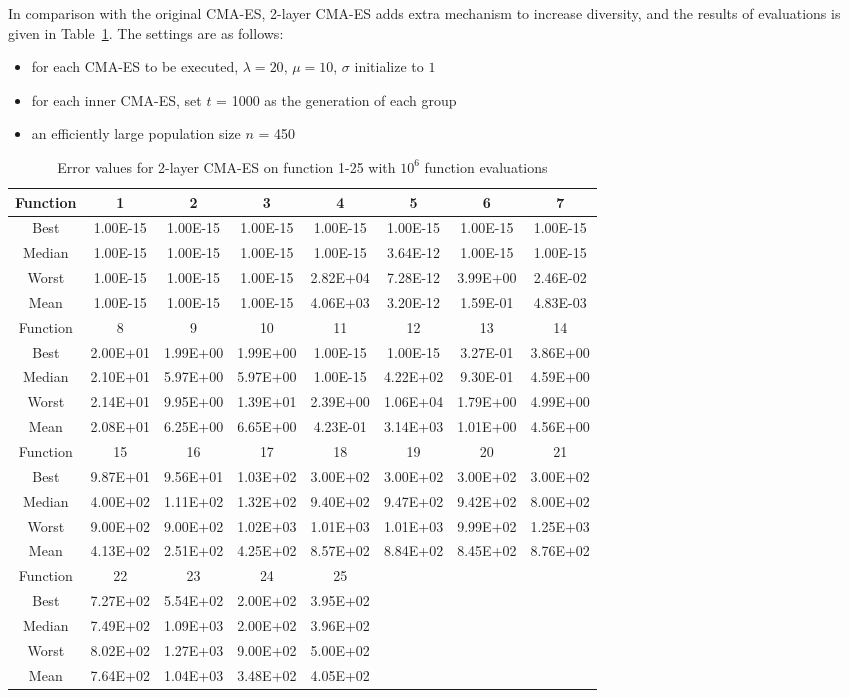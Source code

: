 In comparison with the original CMA-ES, 2-layer CMA-ES adds extra
mechanism to increase diversity, and the results of evaluations is given
in Table~\ref{table:2layercmaes}.
The settings are as follows:
\begin{itemize}
  \item{for each CMA-ES to be executed, $\lambda = 20$,
      $\mu=10$, $\sigma$ initialize to $1$}
  \item{for each inner CMA-ES, set $t$ = 1000 as the generation of each
    group}
  \item{an efficiently large population size $n$ = 450}
  \end{itemize}

\begin{table}[h]
\footnotesize
  \centering
\begin{tabular}{@{}cccccccc@{}}
\toprule
Function&1       &2       &3       &4       &5       &6       &7     \\ \midrule
Best    &1.00E-15&1.00E-15&1.00E-15&1.00E-15&1.00E-15&1.00E-15&1.00E-15 \\
Median  &1.00E-15&1.00E-15&1.00E-15&1.00E-15&3.64E-12&1.00E-15&1.00E-15\\
Worst   &1.00E-15&1.00E-15&1.00E-15&2.82E+04&7.28E-12&3.99E+00&2.46E-02\\
Mean    &1.00E-15&1.00E-15&1.00E-15&4.06E+03&3.20E-12&1.59E-01&4.83E-03\\\midrule
Function&8       &9       &10      &11      &12      &13      &14      \\\midrule
Best    &2.00E+01&1.99E+00&1.99E+00&1.00E-15&1.00E-15&3.27E-01&3.86E+00\\
Median  &2.10E+01&5.97E+00&5.97E+00&1.00E-15&4.22E+02&9.30E-01&4.59E+00 \\
Worst   &2.14E+01&9.95E+00&1.39E+01&2.39E+00&1.06E+04&1.79E+00&4.99E+00\\
Mean    &2.08E+01&6.25E+00&6.65E+00&4.23E-01&3.14E+03&1.01E+00&4.56E+00\\\midrule
Function&15      &16      &17      &18      &19      &20      &21\\\midrule
Best    &9.87E+01&9.56E+01&1.03E+02&3.00E+02&3.00E+02&3.00E+02&3.00E+02\\
Median  &4.00E+02&1.11E+02&1.32E+02&9.40E+02&9.47E+02&9.42E+02&8.00E+02\\
Worst   &9.00E+02&9.00E+02&1.02E+03&1.01E+03&1.01E+03&9.99E+02&1.25E+03\\
Mean    &4.13E+02&2.51E+02&4.25E+02&8.57E+02&8.84E+02&8.45E+02&8.76E+02\\\midrule
Function&22      &23      &24      &25&&&\\\midrule
Best    &7.27E+02&5.54E+02&2.00E+02&3.95E+02&&&\\
Median  &7.49E+02&1.09E+03&2.00E+02&3.96E+02&&&\\
Worst   &8.02E+02&1.27E+03&9.00E+02&5.00E+02&&&\\
Mean    &7.64E+02&1.04E+03&3.48E+02&4.05E+02&&&\\\bottomrule
\end{tabular}
\caption{Error values for 2-layer CMA-ES on function 1-25 with $10^6$ function evaluations}
\label{table:2layercmaes}
\end{table}


